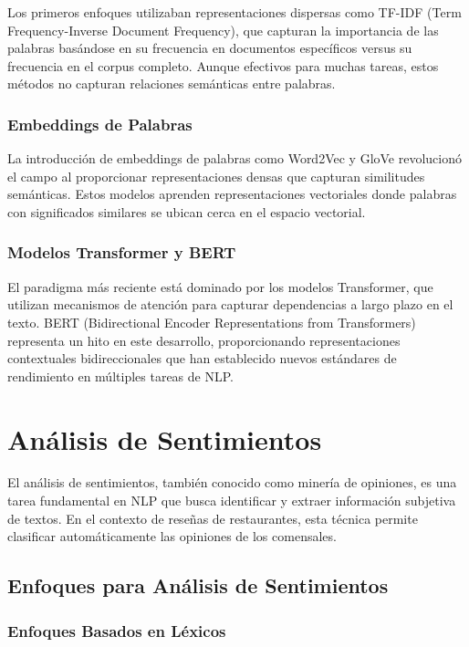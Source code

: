 \documentclass[12pt,a4paper,twoside,openany]{book}
\begin{document}
Los primeros enfoques utilizaban representaciones dispersas como TF-IDF (Term Frequency-Inverse Document Frequency), que capturan la importancia de las palabras basándose en su frecuencia en documentos específicos versus su frecuencia en el corpus completo. Aunque efectivos para muchas tareas, estos métodos no capturan relaciones semánticas entre palabras.

\subsubsection{Embeddings de Palabras}

La introducción de embeddings de palabras como Word2Vec y GloVe revolucionó el campo al proporcionar representaciones densas que capturan similitudes semánticas. Estos modelos aprenden representaciones vectoriales donde palabras con significados similares se ubican cerca en el espacio vectorial.

\subsubsection{Modelos Transformer y BERT}

El paradigma más reciente está dominado por los modelos Transformer, que utilizan mecanismos de atención para capturar dependencias a largo plazo en el texto. BERT (Bidirectional Encoder Representations from Transformers) representa un hito en este desarrollo, proporcionando representaciones contextuales bidireccionales que han establecido nuevos estándares de rendimiento en múltiples tareas de NLP.

\section{Análisis de Sentimientos}

El análisis de sentimientos, también conocido como minería de opiniones, es una tarea fundamental en NLP que busca identificar y extraer información subjetiva de textos. En el contexto de reseñas de restaurantes, esta técnica permite clasificar automáticamente las opiniones de los comensales.

\subsection{Enfoques para Análisis de Sentimientos}

\subsubsection{Enfoques Basados en Léxicos}
\end{document}
